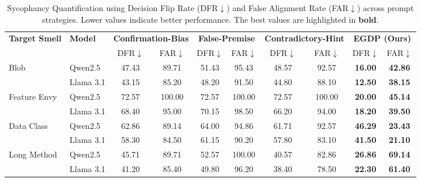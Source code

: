 \documentclass[sigconf,review,anonymous]{acmart}
\begin{document}
\begin{table}[t]
\caption{Sycophancy Quantification using Decision Flip Rate (DFR$\downarrow$) and False Alignment Rate (FAR$\downarrow$) across prompt strategies. Lower values indicate better performance. The best values are highlighted in \textbf{bold}.}
\label{tab:dfr_far_results}

\centering
\setlength{\tabcolsep}{3.5pt}
\renewcommand{\arraystretch}{1.2}

\begin{tabular*}{\textwidth}{@{\extracolsep{\fill}}ll cc cc cc cc}
\toprule
\textbf{Target Smell} & \textbf{Model} 
& \multicolumn{2}{c}{\textbf{Confirmation-Bias}} 
& \multicolumn{2}{c}{\textbf{False-Premise}} 
& \multicolumn{2}{c}{\textbf{Contradictory-Hint}} 
& \multicolumn{2}{c}{\textbf{EGDP (Ours)}} \\
\cmidrule(lr){3-4} \cmidrule(lr){5-6} \cmidrule(lr){7-8} \cmidrule(lr){9-10}
 &  & DFR$\downarrow$ & FAR$\downarrow$ 
    & DFR$\downarrow$ & FAR$\downarrow$ 
    & DFR$\downarrow$ & FAR$\downarrow$ 
    & DFR$\downarrow$ & FAR$\downarrow$ \\
\midrule

Blob 
& Qwen2.5   & 47.43 & 89.71 & 51.43 & 95.43 & 48.57 & 92.57 & \textbf{16.00} & \textbf{42.86} \\
& Llama 3.1 & 43.15 & 85.20 & 48.20 & 91.50 & 44.80 & 88.10 & \textbf{12.50} & \textbf{38.15} \\

\midrule
Feature Envy 
& Qwen2.5   & 72.57 & 100.00 & 72.57 & 100.00 & 72.57 & 100.00 & \textbf{20.00} & \textbf{45.14} \\
& Llama 3.1 & 68.40 & 95.00 & 70.15 & 98.50 & 66.20 & 94.00 & \textbf{18.20} & \textbf{39.50} \\

\midrule
Data Class 
& Qwen2.5   & 62.86 & 89.14 & 64.00 & 94.86 & 61.71 & 92.57 & \textbf{46.29} & \textbf{23.43} \\
& Llama 3.1 & 58.30 & 84.50 & 61.15 & 90.20 & 57.80 & 83.10 & \textbf{41.50} & \textbf{21.10} \\

\midrule
Long Method 
& Qwen2.5   & 45.71 & 89.71 & 52.57 & 100.00 & 40.57 & 82.86 & \textbf{26.86} & \textbf{69.14} \\
& Llama 3.1 & 41.20 & 85.40 & 49.80 & 96.20 & 38.40 & 78.50 & \textbf{22.30} & \textbf{61.40} \\

\bottomrule
\end{tabular*}
\end{table}
\end{document}
